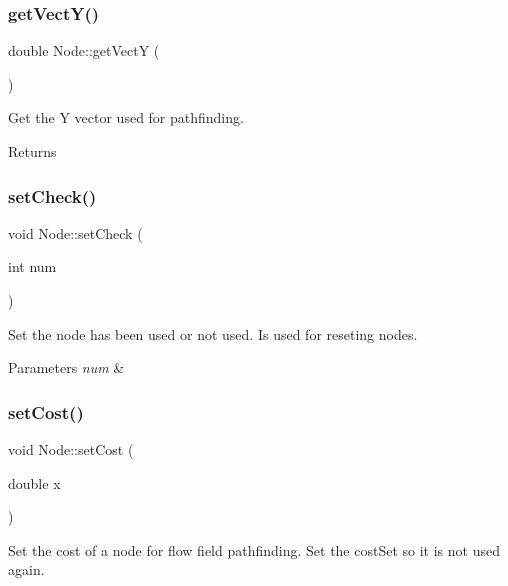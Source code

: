 \subsubsection{\texorpdfstring{getVectY()}{getVectY()}}
{\footnotesize\ttfamily double Node\+::get\+VectY (\begin{DoxyParamCaption}{ }\end{DoxyParamCaption})}



Get the Y vector used for pathfinding. 

\begin{DoxyReturn}{Returns}

\end{DoxyReturn}
\mbox{\label{class_node_a88680b24156b672fc7cb3598e03b065b}} 
\subsubsection{\texorpdfstring{setCheck()}{setCheck()}}
{\footnotesize\ttfamily void Node\+::set\+Check (\begin{DoxyParamCaption}\item[{int}]{num }\end{DoxyParamCaption})}



Set the node has been used or not used. Is used for reseting nodes. 


\begin{DoxyParams}{Parameters}
{\em num} & \\
\hline
\end{DoxyParams}
\mbox{\label{class_node_adefee65f1133ce5f2e0b5a363e250ae6}} 
\subsubsection{\texorpdfstring{setCost()}{setCost()}}
{\footnotesize\ttfamily void Node\+::set\+Cost (\begin{DoxyParamCaption}\item[{double}]{x }\end{DoxyParamCaption})}



Set the cost of a node for flow field pathfinding. Set the cost\+Set so it is not used again. 


